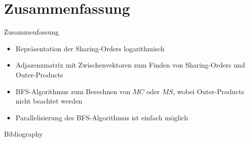 \documentclass{beamer}
\begin{document}
\section{Zusammenfassung}

\begin{frame}{Zusammenfassung}
	\begin{itemize}
		\item Repräsentation der Sharing-Orders logarithmisch
		\item Adjazenzmatrix mit Zwischenvektoren zum Finden von Sharing-Orders und Outer-Products
		\item BFS-Algorithmus zum Berechnen von $MC$ oder $MS$, wobei Outer-Products nicht beachtet werden
		\item Parallelisierung des BFS-Algorithmus ist einfach möglich
	\end{itemize}
\end{frame}

\begin{frame}[allowframebreaks]{Bibliography}
	
	
\end{frame}
\end{document}
